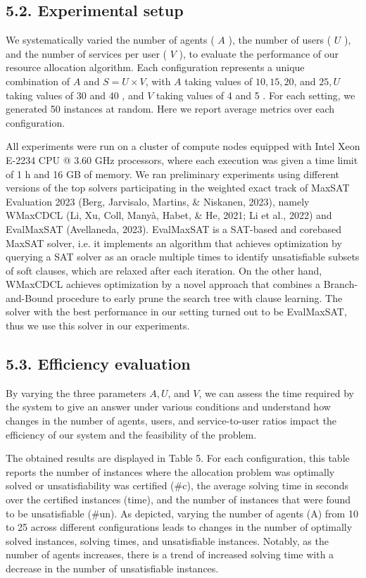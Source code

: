 \documentclass[10pt]{article}
\begin{document}
\subsection*{5.2. Experimental setup}
We systematically varied the number of agents ( $A$ ), the number of users ( $U$ ), and the number of services per user ( $V$ ), to evaluate the performance of our resource allocation algorithm. Each configuration represents a unique combination of $A$ and $S=U \times V$, with $A$ taking values of $10,15,20$, and $25, U$ taking values of 30 and 40 , and $V$ taking values of 4 and 5 . For each setting, we generated 50 instances at random. Here we report average metrics over each configuration.

All experiments were run on a cluster of compute nodes equipped with Intel Xeon E-2234 CPU @ 3.60 GHz processors, where each execution was given a time limit of 1 h and 16 GB of memory. We ran preliminary experiments using different versions of the top solvers participating in the weighted exact track of MaxSAT Evaluation 2023 (Berg, Jarvisalo, Martins, \& Niskanen, 2023), namely WMaxCDCL (Li, Xu, Coll, Manyà, Habet, \& He, 2021; Li et al., 2022) and EvalMaxSAT (Avellaneda, 2023). EvalMaxSAT is a SAT-based and corebased MaxSAT solver, i.e. it implements an algorithm that achieves optimization by querying a SAT solver as an oracle multiple times to identify unsatisfiable subsets of soft clauses, which are relaxed after each iteration. On the other hand, WMaxCDCL achieves optimization by a novel approach that combines a Branch-and-Bound procedure to early prune the search tree with clause learning. The solver with the best performance in our setting turned out to be EvalMaxSAT, thus we use this solver in our experiments.

\subsection*{5.3. Efficiency evaluation}
By varying the three parameters $A, U$, and $V$, we can assess the time required by the system to give an answer under various conditions and understand how changes in the number of agents, users, and service-to-user ratios impact the efficiency of our system and the feasibility of the problem.

The obtained results are displayed in Table 5. For each configuration, this table reports the number of instances where the allocation problem was optimally solved or unsatisfiability was certified (\#c), the average solving time in seconds over the certified instances (time), and the number of instances that were found to be unsatisfiable (\#un). As depicted, varying the number of agents (A) from 10 to 25 across different configurations leads to changes in the number of optimally solved instances, solving times, and unsatisfiable instances. Notably, as the number of agents increases, there is a trend of increased solving time with a decrease in the number of unsatisfiable instances.
\end{document}
